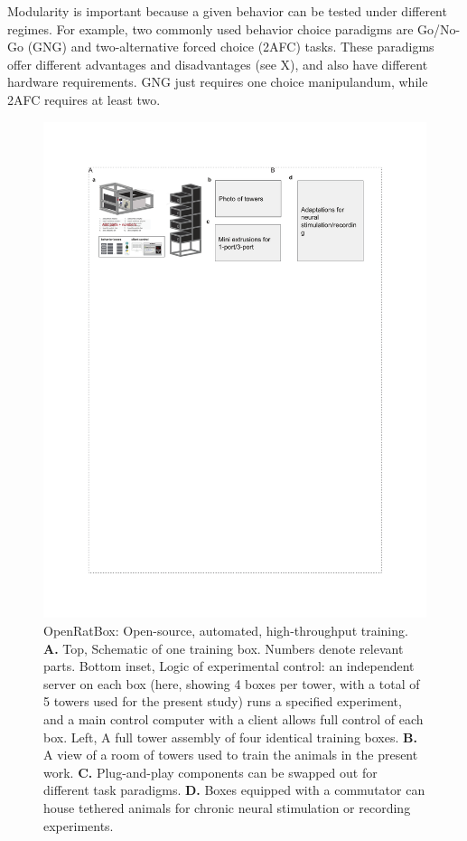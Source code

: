Modularity is important because a given behavior can be tested under different regimes. For example, two commonly used behavior choice paradigms are Go/No-Go (GNG) and two-alternative forced choice (2AFC) tasks. These paradigms offer different advantages and disadvantages (see X), and also have different hardware requirements. GNG just requires one choice manipulandum, while 2AFC requires at least two.

\begin{figure}[t!]
    \includegraphics[width=\textwidth]{figures/chapter_1/fig_1-1_openratbox/fig_1-1_openratbox.pdf}
    \vspace{.1in}
    \caption[OpenRatBox]{OpenRatBox: Open-source, automated, high-throughput training. \textbf{A.} Top, Schematic of one training box. Numbers denote relevant parts. Bottom inset, Logic of experimental control: an independent server on each box (here, showing 4 boxes per tower, with a total of 5 towers used for the present study) runs a specified experiment, and a main control computer with a client allows full control of each box. Left, A full tower assembly of four identical training boxes. \textbf{B.} A view of a room of towers used to train the animals in the present work. \textbf{C.} Plug-and-play components can be swapped out for different task paradigms. \textbf{D.} Boxes equipped with a commutator can house tethered animals for chronic neural stimulation or recording experiments.  
    \label{fig:openratbox}}
\end{figure}

